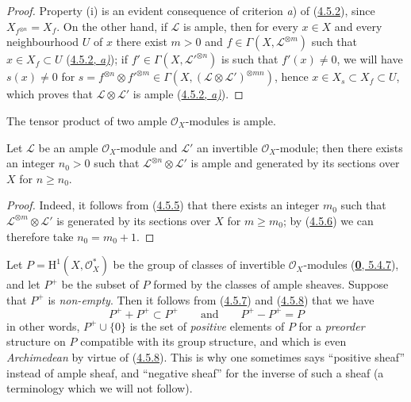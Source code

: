 \begin{proof}
Property (i) is an evident consequence of criterion \emph{a}) of
(\hyperref[II.4.5.2]{4.5.2}), since $X_{f^{\otimes n}}=X_f$. On the other
hand, if $\mathcal{L}$ is ample, then for every $x\in X$ and every neighbourhood $U$ of
$x$ there exist $m>0$ and $f\in\Gamma(X,\mathcal{L}^{\otimes m})$ such that
$x\in X_f\subset U$ (\hyperref[II.4.5.2]{4.5.2, \emph{a)}}); if
$f'\in\Gamma(X,\mathcal{L}'^{\otimes n})$ is such that $f'(x)\neq0$, we will have
$s(x)\neq0$ for
$s=f^{\otimes n}\otimes f'^{\otimes m}\in
\Gamma(X,(\mathcal{L}\otimes\mathcal{L}')^{\otimes mn})$, hence
$x\in X_s\subset X_f\subset U$, which proves that
$\mathcal{L}\otimes\mathcal{L}'$ is ample
(\hyperref[II.4.5.2]{4.5.2, \emph{a)}}).
\end{proof}

\begin{corollary}[4.5.7]
\label{II.4.5.7}
The tensor product of two ample $\mathcal{O}_X$-modules is ample.
\end{corollary}

\begin{corollary}[4.5.8]
\label{II.4.5.8}
Let $\mathcal{L}$ be an ample $\mathcal{O}_X$-module and $\mathcal{L}'$ an
invertible $\mathcal{O}_X$-module; then there exists an integer $n_0>0$ such
that $\mathcal{L}^{\otimes n}\otimes\mathcal{L}'$ is ample and generated by
its sections over $X$ for $n\geq n_0$.
\end{corollary}

\begin{proof}
Indeed, it follows from (\hyperref[II.4.5.5]{4.5.5}) that there exists an integer
$m_0$ such that $\mathcal{L}^{\otimes m}\otimes\mathcal{L}'$ is generated by
its sections over $X$ for $m\geq m_0$; by
(\hyperref[II.4.5.6]{4.5.6}) we can therefore take $n_0=m_0+1$.
\end{proof}

\begin{remark}[4.5.9]
\label{II.4.5.9}
Let $P=\mathrm{H}^1(X,\mathcal{O}_X^*)$ be the group of classes of
invertible $\mathcal{O}_X$-modules (\hyperref[0.5.4.7]{\textbf{0}, 5.4.7}), and
let $P^+$ be the subset of $P$ formed by the classes of ample sheaves. Suppose
that $P^+$ is \emph{non-empty}. Then it follows from
(\hyperref[II.4.5.7]{4.5.7}) and
(\hyperref[II.4.5.8]{4.5.8}) that we have
\[
  P^++P^+\subset P^+
  \qquad\text{and}\qquad
  P^+-P^+=P
\]
in other words, $P^+\cup\{0\}$ is the set of \emph{positive} elements of $P$
for a \emph{preorder} structure on $P$ compatible with its group
structure, and which is even \emph{Archimedean} by virtue of
(\hyperref[II.4.5.8]{4.5.8}). This is why one sometimes says ``positive
sheaf'' instead of ample sheaf, and ``negative sheaf'' for the inverse
of such a sheaf (a terminology which we will not follow).
\end{remark}

